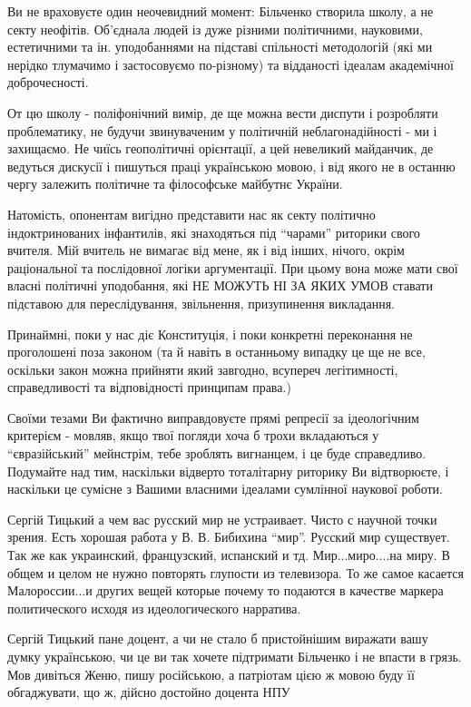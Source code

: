 \begin{itemize}
\begin{itemize}
Ви не враховуєте один неочевидний момент: Більченко створила школу, а не секту
неофітів. Об'єднала людей із дуже різними політичними, науковими, естетичними
та ін. уподобаннями на підставі спільності методологій (які ми нерідко
тлумачимо і застосовуємо по-різному) та відданості ідеалам академічної
доброчесності. 

От цю школу - поліфонічний вимір, де ще можна вести диспути і розробляти
проблематику, не будучи звинуваченим у політичній неблагонадійності - ми і
захищаємо. Не чиїсь геополітичні орієнтації, а цей невеликий майданчик, де
ведуться дискусії і пишуться праці українською мовою, і від якого не в останню
чергу залежить політичне та філософське майбутнє України. 

Натомість, опонентам вигідно представити нас як секту політично індоктринованих
інфантилів, які знаходяться під \enquote{чарами} риторики свого вчителя. Мій
вчитель не вимагає від мене, як і від інших, нічого, окрім раціональної та
послідовної логіки аргументації. При цьому вона може мати свої власні політичні
уподобання, які НЕ МОЖУТЬ НІ ЗА ЯКИХ УМОВ ставати підставою для переслідування,
звільнення, призупинення викладання. 

Принаймні, поки у нас діє Конституція, і поки конкретні переконання не
проголошені поза законом (та й навіть в останньому випадку це ще не все,
оскільки закон можна прийняти який завгодно, всупереч легітимності,
справедливості та відповідності принципам права.) 

Своїми тезами Ви фактично виправдовуєте прямі репресії за ідеологічним
критерієм - мовляв, якщо твої погляди хоча б трохи вкладаються у
\enquote{євразійський} мейнстрім, тебе зроблять вигнанцем, і це буде
справедливо. Подумайте над тим, наскільки відверто тоталітарну риторику Ви
відтворюєте, і наскільки це сумісне з Вашими власними ідеалами сумлінної
наукової роботи.


Сергій Тицький а чем вас русский мир не устраивает. Чисто с научной точки
зрения. Есть хорошая работа у В. В. Бибихина \enquote{мир}. Русский мир
существует. Так же как украинский, французский, испанский и тд.
Мир...миро....на миру. В общем и целом не нужно повторять глупости из
телевизора. То же самое касается Малороссии...и других вещей которые почему то
подаются в качестве маркера политического исходя из идеологического нарратива.


Сергій Тицький пане доцент, а чи не стало б пристойнішим виражати вашу думку
українською, чи це ви так хочете підтримати Більченко і не впасти в грязь. Мов
дивіться Женю, пишу російською, а патріотам цією ж мовою буду її обгаджувати,
що ж, дійсно достойно доцента НПУ

\end{itemize}

\end{itemize}
